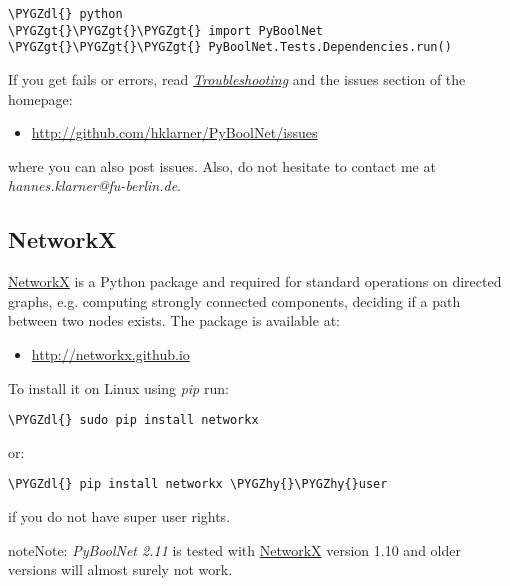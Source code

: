 \documentclass[letterpaper,10pt,english]{sphinxmanual}
\def\PYGZgt{\char`\>}
\def\PYGZdl{\char`\$}
\def\PYGZhy{\char`\-}
\begin{document}
\begin{Verbatim}[commandchars=\\\{\}]
\PYGZdl{} python
\PYGZgt{}\PYGZgt{}\PYGZgt{} import PyBoolNet
\PYGZgt{}\PYGZgt{}\PYGZgt{} PyBoolNet.Tests.Dependencies.run()
\end{Verbatim}

If you get fails or errors, read {\hyperref[Installation:installation-troubleshooting]{\emph{Troubleshooting}}} and the issues section of the homepage:
\begin{itemize}
\item {} 
\href{http://github.com/hklarner/PyBoolNet/issues}{http://github.com/hklarner/PyBoolNet/issues}

\end{itemize}

where you can also post issues. Also, do not hesitate to contact me at \emph{hannes.klarner@fu-berlin.de}.


\subsection{NetworkX}
\label{Installation:installation-networkx}\label{Installation:networkx}
\href{https://networkx.github.io/}{NetworkX} is a Python package and required for standard operations on directed graphs, e.g. computing strongly connected components,
deciding if a path between two nodes exists.
The package is available at:
\begin{itemize}
\item {} 
\href{http://networkx.github.io}{http://networkx.github.io}

\end{itemize}

To install it on Linux using \emph{pip} run:

\begin{Verbatim}[commandchars=\\\{\}]
\PYGZdl{} sudo pip install networkx
\end{Verbatim}

or:

\begin{Verbatim}[commandchars=\\\{\}]
\PYGZdl{} pip install networkx \PYGZhy{}\PYGZhy{}user
\end{Verbatim}

if you do not have super user rights.

\begin{notice}{note}{Note:}
\emph{PyBoolNet 2.11} is tested with \href{https://networkx.github.io/}{NetworkX} version 1.10 and older versions will almost surely not work.
\end{notice}
\end{document}
